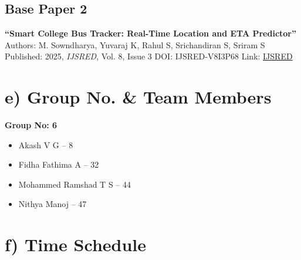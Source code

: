 \documentclass[11pt,a4paper]{article}
\begin{document}
\subsection*{Base Paper 2}
\textbf{“Smart College Bus Tracker: Real-Time Location and ETA Predictor”}  
Authors: M. Sowndharya, Yuvaraj K, Rahul S, Srichandiran S, Sriram S  
Published: 2025, \textit{IJSRED}, Vol. 8, Issue 3  
DOI: IJSRED-V8I3P68  
Link: \href{https://ijsred.com/volume8/issue3/IJSRED-V8I3P68.pdf}{IJSRED}

\section*{e) Group No. \& Team Members}
\textbf{Group No: 6}
\begin{itemize}
    \item Akash V G – 8
    \item Fidha Fathima A – 32
    \item Mohammed Ramshad T S – 44
    \item Nithya Manoj – 47
\end{itemize}

\section*{f) Time Schedule}
\end{document}
